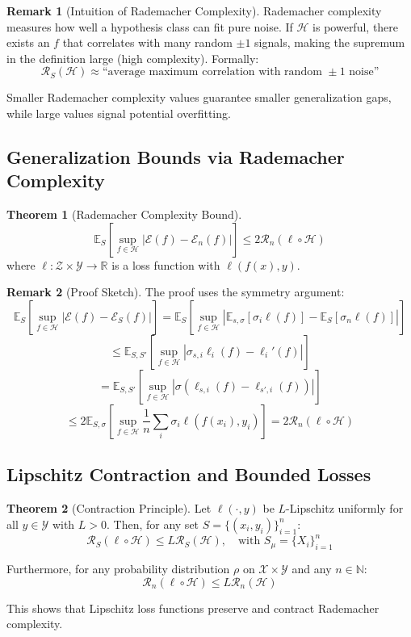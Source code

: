 \documentclass[12pt,a4paper]{article}
\theoremstyle{definition}
\newtheorem{theorem}{Theorem}[section]
\newtheorem{remark}{Remark}[section]
\begin{document}
\begin{remark}[Intuition of Rademacher Complexity]
Rademacher complexity measures how well a hypothesis class can fit pure noise. If $\mathcal{H}$ is powerful, there exists an $f$ that correlates with many random $\pm 1$ signals, making the supremum in the definition large (high complexity). Formally:
\[
\mathcal{R}_S(\mathcal{H}) \approx \text{``average maximum correlation with random } \pm 1 \text{ noise''}
\]

Smaller Rademacher complexity values guarantee smaller generalization gaps, while large values signal potential overfitting.
\end{remark}

\subsection{Generalization Bounds via Rademacher Complexity}

\begin{theorem}[Rademacher Complexity Bound]
\[
\mathbb{E}_S \left[\sup_{f \in \mathcal{H}} |\mathcal{E}(f) - \mathcal{E}_n(f)|\right] \leq 2\mathcal{R}_n(\ell \circ \mathcal{H})
\]
where $\ell: \mathcal{Z} \times \mathcal{Y} \to \mathbb{R}$ is a loss function with $\ell(f(x), y)$.
\end{theorem}

\begin{remark}[Proof Sketch]
The proof uses the symmetry argument:
\[
\mathbb{E}_S[\sup_{f \in \mathcal{H}} |\mathcal{E}(f) - \mathcal{E}_S(f)|] = \mathbb{E}_S\left[\sup_{f \in \mathcal{H}} \left|\mathbb{E}_{s,\sigma}\left[\sigma_i \ell(f)\right] - \mathbb{E}_S[\sigma_n \ell(f)]\right|\right]
\]
\[
\leq \mathbb{E}_{S,S'}\left[\sup_{f \in \mathcal{H}} |\sigma_{s,i} \ell_i(f) - \ell_i'(f)|\right]
\]
\[
= \mathbb{E}_{S,S'}\left[\sup_{f \in \mathcal{H}} |\sigma(\ell_{s,i}(f) - \ell_{s',i}(f))|\right]
\]
\[
\leq 2\mathbb{E}_{S,\sigma}\left[\sup_{f \in \mathcal{H}} \frac{1}{n}\sum_i \sigma_i \ell(f(x_i), y_i)\right] = 2\mathcal{R}_n(\ell \circ \mathcal{H})
\]
\end{remark}

\subsection{Lipschitz Contraction and Bounded Losses}

\begin{theorem}[Contraction Principle]
Let $\ell(\cdot, y)$ be $L$-Lipschitz uniformly for all $y \in \mathcal{Y}$ with $L > 0$. Then, for any set $S = \{(x_i, y_i)\}_{i=1}^n$:
\[
\mathcal{R}_S(\ell \circ \mathcal{H}) \leq L \mathcal{R}_S(\mathcal{H}), \quad \text{with } S_\mu = \{X_i\}_{i=1}^n
\]

Furthermore, for any probability distribution $\rho$ on $\mathcal{X} \times \mathcal{Y}$ and any $n \in \mathbb{N}$:
\[
\mathcal{R}_n(\ell \circ \mathcal{H}) \leq L\mathcal{R}_n(\mathcal{H})
\]

This shows that Lipschitz loss functions preserve and contract Rademacher complexity.
\end{theorem}
\end{document}
